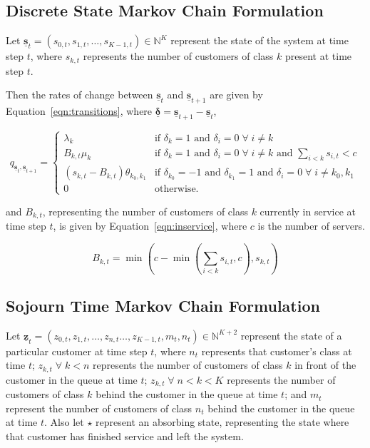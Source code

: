 \documentclass{article}
\begin{document}
\subsection{Discrete State Markov Chain Formulation}\label{sec:state_formulation}
Let
$\underline{\mathbf{s}}_t = (s_{0,t}, s_{1,t}, \dots, s_{K-1,t}) \in \mathbb{N}^K$
represent the state of the system at time step $t$, where $s_{k,t}$ represents
the number of customers of class $k$ present at time step $t$.

Then the rates of change between $\underline{\mathbf{s}}_t$ and
$\underline{\mathbf{s}}_{t+1}$ are given by Equation~\ref{eqn:transitions},
where $\underline{\mathbf{\delta}} = \underline{\mathbf{s}}_{t+1} - \underline{\mathbf{s}}_t$,

\begin{equation}\label{eqn:transitions}
q_{\underline{\mathbf{s}}_t, \underline{\mathbf{s}}_{t+1}} = 
\begin{cases}
\lambda_k & \text{if } \delta_k = 1 \text{ and } \delta_i = 0 \; \forall \; i \neq k \\
B_{k,t} \mu_k & \text{if } \delta_k = 1 \text{ and } \delta_i = 0 \; \forall \; i \neq k \text{ and } \sum_{i < k} s_{i,t} < c \\
(s_{k,t} - B_{k,t}) \theta_{k_0,k_1} & \text{if } \delta_{k_0} = -1 \text{ and } \delta_{k_1} = 1 \text{ and } \delta_i = 0 \; \forall \; i \neq k_0, k_1 \\
0 & \text{otherwise.}
\end{cases}
\end{equation}

and $B_{k,t}$, representing the number of customers of class $k$ currently in
service at time step $t$, is given by Equation~\ref{eqn:inservice}, where $c$
is the number of servers.

\begin{equation}\label{eqn:inservice}
B_{k,t} =\min\left(c - \min\left(\sum_{i < k} s_{i,t}, c\right), s_{k,t}\right)
\end{equation}




\subsection{Sojourn Time Markov Chain Formulation}\label{sec:sojourn_formulation}
Let $\underline{\mathbf{z}}_t = (z_{0,t}, z_{1,t}, \dots, z_{n,t} \dots, z_{K-1,t}, m_t, n_t) \in \mathbb{N}^{K+2}$
represent the state of a particular customer at time step $t$, where $n_t$
represents that customer's class at time $t$; $z_{k,t} \; \forall \; k < n$
represents the number of customers of class $k$ in front of the customer in the
queue at time $t$; $z_{k,t} \; \forall \; n < k < K$ represents the number of
customers of class $k$ behind the customer in the queue at time $t$; and $m_t$
represent the number of customers of class $n_t$ behind the customer in the
queue at time $t$.
Also let $\star$ represent an absorbing state, representing the state where that
customer has finished service and left the system.
\end{document}
